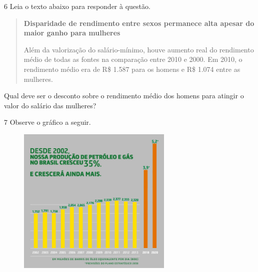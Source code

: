 \begin{escolha}
\num{6} Leia o texto abaixo para responder à questão.

\begin{quote}
\textbf{Disparidade de rendimento entre sexos permanece alta
apesar do maior ganho para mulheres}

Além da valorização do salário-mínimo, houve aumento real do rendimento
médio de todas as fontes na comparação entre 2010 e 2000. Em 2010, o
rendimento médio era de R\$ 1.587 para os homens e R\$ 1.074 entre as
mulheres.

\end{quote}

Qual deve ser o desconto sobre o rendimento médio dos homens para
atingir o valor do salário das mulheres?

\begin{boxmedio}
\end{boxmedio}

\num{7} Observe o gráfico a seguir. 

\begin{figure}
\centering
\includegraphics[width=2.91782in,height=2.79636in]{./_SAEB_9_MAT/media/image64.jpg}
\end{figure}



\end{escolha}
